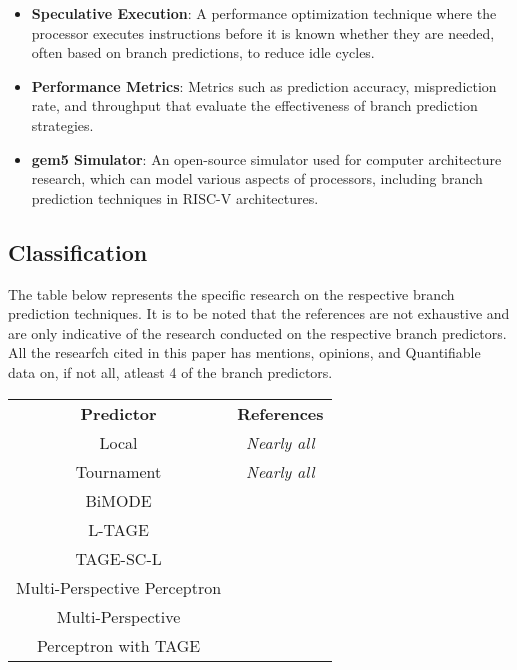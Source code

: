 \documentclass[10pt,journal,compsoc]{IEEEtran}
\begin{document}
\begin{itemize}
    \item \textbf{Speculative Execution}: A performance optimization technique where the processor executes instructions before it is known whether they are needed, often based on branch predictions, to reduce idle cycles.
    
    \item \textbf{Performance Metrics}: Metrics such as prediction accuracy, misprediction rate, and throughput that evaluate the effectiveness of branch prediction strategies.
    
    \item \textbf{gem5 Simulator}: An open-source simulator used for computer architecture research, which can model various aspects of processors, including branch prediction techniques in RISC-V architectures.\cite{lowepower2020gem5simulatorversion200}
\end{itemize}
\subsection{Classification}
The table below represents the specific research on the respective branch prediction techniques.
It is to be noted that the references are not exhaustive and are only indicative of the research conducted on the respective branch predictors.
All the researfch cited in this paper has mentions, opinions, and Quantifiable data on, if not all, atleast 4 of the branch predictors.
\begin{center}
\begin{tabular}{c c}
    \textbf{Predictor} & \textbf{References} \\
    Local & \textit{Nearly all}\\
    Tournament & \textit{Nearly all}\\
    BiMODE &\cite{nainImplementationComparisonBimodal2021}\\
    L-TAGE &\cite{matsuiEfficientImplementationTAGE2019,seznecStorageFreeConfidence2011,seznec64KbytesISLTAGE,seznecNewCaseTAGE2011}\\
    TAGE-SC-L &\cite{linBranchPredictionNot2019a,seznecTAGESCBranchPredictorsAgain2016,seznecTAGESCBranchPredictors2014}\\
    Multi-Perspective Perceptron &\cite{jimenezDynamicBranchPrediction2001,tarjanMergingPathGshare2005,garzaBitlevelPerceptronPrediction2019,josephSurveyDeepLearning2021a}\\
    Multi-Perspective \\Perceptron with TAGE &\cite{jimenezDynamicBranchPrediction2001,tarjanMergingPathGshare2005,garzaBitlevelPerceptronPrediction2019,josephSurveyDeepLearning2021a}\\
\end{tabular}
\end{center}
\end{document}
